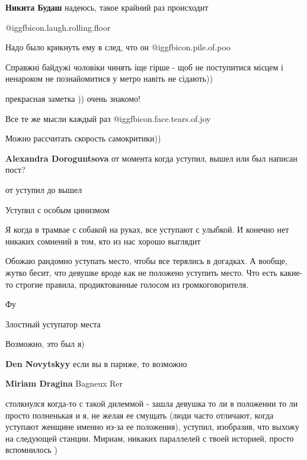 \begin{itemize}
\textbf{Никита Будаш} надеюсь, такое крайний раз происходит

 @igg{fbicon.laugh.rolling.floor} 

Надо было крикнуть ему в след, что он  @igg{fbicon.pile.of.poo} 

Справжні байдужі чоловіки чинять іще гірше - щоб не поступитися місцем і ненароком не познайомитися у метро навіть не сідають))

прекрасная заметка )) очень знакомо!

Все те же мысли каждый раз  @igg{fbicon.face.tears.of.joy} 

Можно рассчитать скорость самокритики))

\begin{itemize} %
\textbf{Alexandra Doroguntsova} от момента когда уступил, вышел или был написан пост?

от уступил до вышел
\end{itemize} %

Уступил с особым цинизмом

Я когда в трамвае с собакой на руках, все уступают с улыбкой.
И конечно нет никаких сомнений в том, кто из нас хорошо выглядит


Обожаю рандомно уступать место, чтобы все терялись в догадках. А вообще, жутко
бесит, что девушке вроде как не положено уступить место. Что есть какие-то
строгие правила, продиктованные голосом из громкоговорителя.

Фу

Злостный уступатор места

Возможно, это был я)

\begin{itemize} %
\textbf{Den Novytskyy} если вы в париже, то возможно

\textbf{Miriam Dragina} Bagneux Rer
\end{itemize} %


столкнулся когда-то с такой дилеммой - зашла девушка то ли в положении то ли
просто полненькая и я, не желая ее смущать (люди часто отличают, когда уступают
женщине именно из-за ее положения), уступил, изобразив, что выхожу на следующей
станции. Мириам, никаких параллелей с твоей историей, просто вспомнилось )


\end{itemize}

